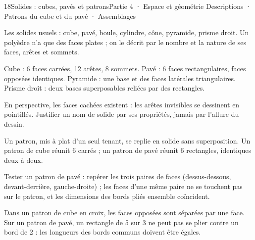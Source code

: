 \begin{ouverture}[espace]{18}{Solides : cubes, pavés et patrons}{Partie 4 · Espace et géométrie}
{Descriptions · Patrons du cube et du pavé · Assemblages}
\end{ouverture}
\pagestyle{otMain}\essentiel\fontsize{11}{15}\selectfont
{}\label{cours-18-1}
\begin{definition}Les solides usuels : cube, pavé, boule, cylindre, cône, pyramide, prisme droit. Un polyèdre n’a que des faces plates ; on le décrit par le nombre et la nature de ses faces, arêtes et sommets.\end{definition}
\label{fig-cours-18-1-cours-solides}

\begin{propriete}Cube : 6 faces carrées, 12 arêtes, 8 sommets. Pavé : 6 faces rectangulaires, faces opposées identiques. Pyramide : une base et des faces latérales triangulaires. Prisme droit : deux bases superposables reliées par des rectangles.\end{propriete}
\begin{attention}En perspective, les faces cachées existent : les arêtes invisibles se dessinent en pointillés. Justifier un nom de solide par ses propriétés, jamais par l’allure du dessin.\end{attention}
\clearpage
{}\label{cours-18-2}
\begin{definition}Un patron, mis à plat d’un seul tenant, se replie en solide sans superposition. Un patron de cube réunit 6 carrés ; un patron de pavé réunit 6 rectangles, identiques deux à deux.\end{definition}
\label{fig-cours-18-2-cours-patron-pave}

\begin{savoirfaire}Tester un patron de pavé : repérer les trois paires de faces (dessus-dessous, devant-derrière, gauche-droite) ; les faces d’une même paire ne se touchent pas sur le patron, et les dimensions des bords pliés ensemble coïncident.\end{savoirfaire}
\begin{exemple}Dans un patron de cube en croix, les faces opposées sont séparées par une face. Sur un patron de pavé, un rectangle de 5 sur 3 ne peut pas se plier contre un bord de 2 : les longueurs des bords communs doivent être égales.\end{exemple}

